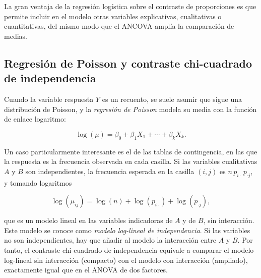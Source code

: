 \documentclass[
  spanish,
  a4paper,
]{scrreport}
\theoremstyle{plain}
\theoremstyle{definition}
\theoremstyle{definition}
\theoremstyle{remark}
\begin{document}
La gran ventaja de la regresión logística sobre el contraste de
proporciones es que permite incluir en el modelo otras variables
explicativas, cualitativas o cuantitativas, del mismo modo que el ANCOVA
amplía la comparación de medias.

\subsection{Regresión de Poisson y contraste chi-cuadrado de
independencia}\label{regresiuxf3n-de-poisson-y-contraste-chi-cuadrado-de-independencia}

Cuando la variable respuesta \(Y\) es un recuento, se suele asumir que
sigue una distribución de Poisson, y la \emph{regresión de Poisson}
modela su media con la función de enlace logaritmo:

\[
\log(\mu) = \beta_0 + \beta_1X_1 + \cdots + \beta_kX_k.
\]

Un caso particularmente interesante es el de las tablas de contingencia,
en las que la respuesta es la frecuencia observada en cada casilla. Si
las variables cualitativas \(A\) y \(B\) son independientes, la
frecuencia esperada en la casilla \((i,j)\) es
\(n\, p_{i\cdot}\, p_{\cdot j}\), y tomando logaritmos

\[
\log(\mu_{ij}) = \log(n) + \log(p_{i\cdot}) + \log(p_{\cdot j}),
\]

que es un modelo lineal en las variables indicadoras de \(A\) y de
\(B\), sin interacción. Este modelo se conoce como \emph{modelo
log-lineal de independencia}. Si las variables no son independientes,
hay que añadir al modelo la interacción entre \(A\) y \(B\). Por tanto,
el contraste chi-cuadrado de independencia equivale a comparar el modelo
log-lineal sin interacción (compacto) con el modelo con interacción
(ampliado), exactamente igual que en el ANOVA de dos factores.
\end{document}
